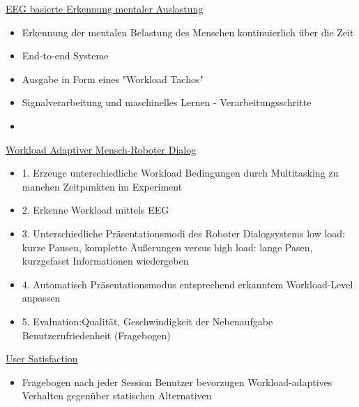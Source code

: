 \documentclass[a4paper,10pt,oneside]{article}
\begin{document}
\underline{EEG basierte Erkennung mentaler Auslastung} \\  	
 	\begin{itemize}
 		\item Erkennung der mentalen Belastung des Menschen kontinuierlich über die Zeit
 		\item End-to-end Systeme
 		\item Ausgabe in Form eines "Workload Tachos"
 		\item Signalverarbeitung und maschinelles Lernen - Verarbeitungsschritte
 		\item[] %
 	\end{itemize}

\underline{Workload Adaptiver Mensch-Roboter Dialog} \\  
	\begin{itemize}
		\item 1. Erzeuge unterschiedliche Workload Bedingungen durch Multitasking zu manchen Zeitpunkten im Experiment
		\item 2. Erkenne Workload mittels EEG
		\item 3. Unterschiedliche Präsentationsmodi des Roboter Dialogsystems low load: kurze Pausen, komplette Äußerungen versus high load: lange Pasen, kurzgefasst Informationen wiedergeben
		\item 4. Automatisch Präsentationsmodus entsprechend erkanntem Workload-Level anpassen
		\item 5. Evaluation:Qualität, Geschwindigkeit der Nebenaufgabe
Benutzerufriedenheit (Fragebogen)
	\end{itemize}
 		
\underline{User Satisfaction} \\  
	\begin{itemize}
		\item Fragebogen nach jeder Session
		\iten Benutzer bevorzugen Workload-adaptives Verhalten gegenüber statischen Alternativen
	\end{itemize}
	

 		
 		
 		
 		
 		
 		
 		
 		
 		
 		
 		
 		
 		
 		
 		
 		
 		
 		
 		
 		
 		
 		
 	

 
\end{document}
